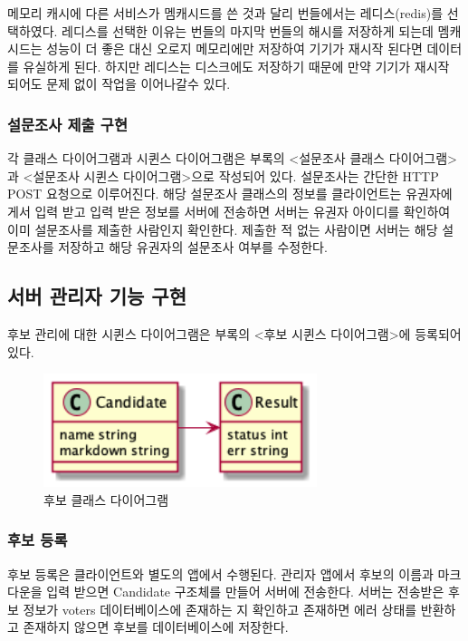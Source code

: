 \documentclass[8pt,a4paper,left=8mm,right=8mm,top=10mm,bottom=10mm]{article}
\begin{document}
    메모리 캐시에 다른 서비스가 멤캐시드를 쓴 것과 달리 번들에서는 레디스(redis)를 선택하였다. 레디스를 선택한 이유는 번들의 마지막 번들의 해시를 저장하게 되는데 멤캐시드는 성능이 더 좋은 대신 오로지 메모리에만 저장하여 기기가 재시작 된다면 데이터를 유실하게 된다. 하지만 레디스는 디스크에도 저장하기 때문에 만약 기기가 재시작 되어도 문제 없이 작업을 이어나갈수 있다.

    \subsubsection{설문조사 제출 구현}

    각 클래스 다이어그램과 시퀸스 다이어그램은 부록의 <설문조사 클래스 다이어그램>과 <설문조사 시퀸스 다이어그램>으로 작성되어 있다.
    설문조사는 간단한 HTTP POST 요청으로 이루어진다. 해당 설문조사 클래스의 정보를 클라이언트는 유권자에게서 입력 받고 입력 받은 정보를 서버에 전송하면 서버는 유권자 아이디를 확인하여 이미 설문조사를 제출한 사람인지 확인한다. 제출한 적 없는 사람이면 서버는 해당 설문조사를 저장하고 해당 유권자의 설문조사 여부를 수정한다.

\subsection{서버 관리자 기능 구현}

    후보 관리에 대한 시퀸스 다이어그램은 부록의 <후보 시퀸스 다이어그램>에 등록되어 있다.

    \begin{figure}[h]
        \begin{center}
            \includegraphics[width=8cm]{candidate}
            \caption{후보 클래스 다이어그램}
        \end{center}
    \end{figure}

    \subsubsection{후보 등록}

    후보 등록은 클라이언트와 별도의 앱에서 수행된다. 관리자 앱에서 후보의 이름과 마크다운을 입력 받으면 Candidate 구조체를 만들어 서버에 전송한다. 서버는 전송받은 후보 정보가 voters 데이터베이스에 존재하는 지 확인하고 존재하면 에러 상태를 반환하고 존재하지 않으면 후보를 데이터베이스에 저장한다.
\end{document}

